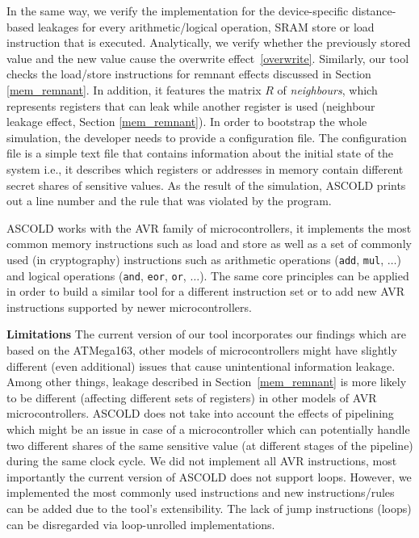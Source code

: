 In the same way, we verify the implementation for the device-specific distance-based leakages 
for every arithmetic/logical operation, SRAM store or load instruction that is executed. Analytically, we verify whether
the previously stored value and the new value cause the overwrite effect~\ref{overwrite}. Similarly, our tool checks the load/store instructions for remnant effects discussed in Section \ref{mem_remnant}. In addition, it features the matrix $R$ of \emph{neighbours}, which represents registers that can leak while another register is used (neighbour leakage effect, Section \ref{mem_remnant}).
In order to bootstrap the whole simulation, the developer needs to provide
a configuration file. The configuration file is a simple text file that contains information about the initial
state of the system i.e., it describes which registers or addresses in memory contain different secret shares of sensitive values.
As the result of the simulation, ASCOLD prints out a line number and the rule that was violated
by the program.

ASCOLD works with the AVR family of microcontrollers, 
it implements the most common memory instructions such as load and store 
as well as a set of commonly used (in cryptography) instructions such as arithmetic operations
(\texttt{add}, \texttt{mul}, $\dots$) and logical operations (\texttt{and}, \texttt{eor}, \texttt{or}, $\dots$). The same core principles can be applied
in order to build a similar tool for a different instruction set or to add 
new AVR instructions supported by newer microcontrollers.

\textbf{Limitations} The current version of our tool
incorporates our findings which are based on the ATMega163, other models of microcontrollers
might have slightly different (even additional) issues that cause unintentional information leakage.
Among other things, leakage described in Section~\ref{mem_remnant} is more likely to be different (affecting different sets of registers) in other models of AVR microcontrollers.
ASCOLD does not take into account the effects of pipelining which might be an issue
in case of a microcontroller which can potentially handle two different shares of the same sensitive
value (at different stages of the pipeline) during the same clock cycle.
We did not implement all AVR instructions, most importantly
the current version of ASCOLD does not support loops.
However, we implemented the most commonly used instructions and new instructions/rules
can be added due to the tool's extensibility. The lack of jump instructions (loops)
can be disregarded via loop-unrolled implementations.
